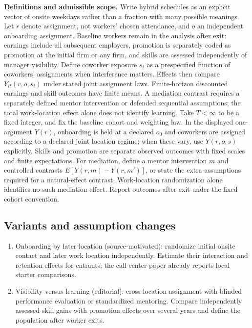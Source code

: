 \documentclass[11pt,a4paper]{article}
\begin{document}
\textbf{Definitions and admissible scope.} Write hybrid schedules as an explicit vector of onsite weekdays rather than a fraction with many possible meanings. Let \(r\) denote assignment, not workers' chosen attendance, and \(o\) an independent onboarding assignment. Baseline workers remain in the analysis after exit: earnings include all subsequent employers, promotion is separately coded as promotion at the initial firm or any firm, and skills are assessed independently of manager visibility. Define coworker exposure \(s_i\) as a prespecified function of coworkers' assignments when interference matters. Effects then compare \(Y_{it}(r,o,s_i)\) under stated joint assignment laws. Finite-horizon discounted earnings and skill outcomes have finite means. A mediation contrast requires a separately defined mentor intervention or defended sequential assumptions; the total work-location effect alone does not identify learning. Take \(T<\infty\) to be a fixed integer, and fix the baseline cohort and weighting law. In the displayed one-argument \(Y(r)\), onboarding is held at a declared \(o_0\) and coworkers are assigned according to a declared joint location regime; when these vary, use \(Y(r,o,s)\) explicitly. Skills and promotion are separate observed outcomes with fixed scales and finite expectations. For mediation, define a mentor intervention \(m\) and controlled contrasts \(E[Y(r,m)-Y(r,m')]\), or state the extra assumptions required for a natural-effect contrast. Work-location randomization alone identifies no such mediation effect. Report outcomes after exit under the fixed cohort convention.
\subsection*{Variants and assumption changes}
\begin{enumerate}
\item Onboarding by later location (source-motivated): randomize initial onsite contact and later work location independently. Estimate their interaction and retention effects for entrants; the call-center paper already reports local starter comparisons.
\item Visibility versus learning (editorial): cross location assignment with blinded performance evaluation or standardized mentoring. Compare independently assessed skill gains with promotion effects over several years and define the population after worker exits.
\end{enumerate}
\end{document}
